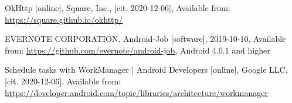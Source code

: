 \begin{thebibliography}{99}
 OkHttp [online], Square, Inc., [cit. 2020-12-06], Available from: \url{https://square.github.io/okhttp/}

 \MakeUppercase{Evernote Corporation}, Android-Job [software], 2019-10-10, Available from: \url{https://github.com/evernote/android-job}, Android 4.0.1 and higher

 Schedule tasks with WorkManager | Android Developers [online], Google LLC, [cit. 2020-12-06], Available from: \url{https://developer.android.com/topic/libraries/architecture/workmanager}


\end{thebibliography}